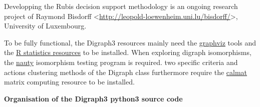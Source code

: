 \documentclass[letterpaper,10pt,english]{sphinxmanual}
\begin{document}
Developping the Rubis decision support methodology is an ongoing research project of Raymond Bisdorff \textless{}\href{http://leopold-loewenheim.uni.lu/bisdorff/}{http://leopold-loewenheim.uni.lu/bisdorff/}\textgreater{}, University of Luxembourg.

To be fully functional, the Digraph3 resources mainly need the \href{http://graphviz.org}{graphviz} tools and the \href{http://www.r-project.org}{R statistics resources} to be installed. When exploring digraph isomorphisms, the \href{http://www.cs.sunysb.edu/~algorith/implement/nauty/implement.shtml}{nauty} isomorphism testing program is required. two specific criteria and actions clustering methods of the Digraph class furthermore require the \href{http://leopold-loewenheim.uni.lu/svn/repos/Calmat/}{calmat} matrix computing resource to be installed.

\textbf{Organisation of the Digraph3 python3 source code}
\end{document}
